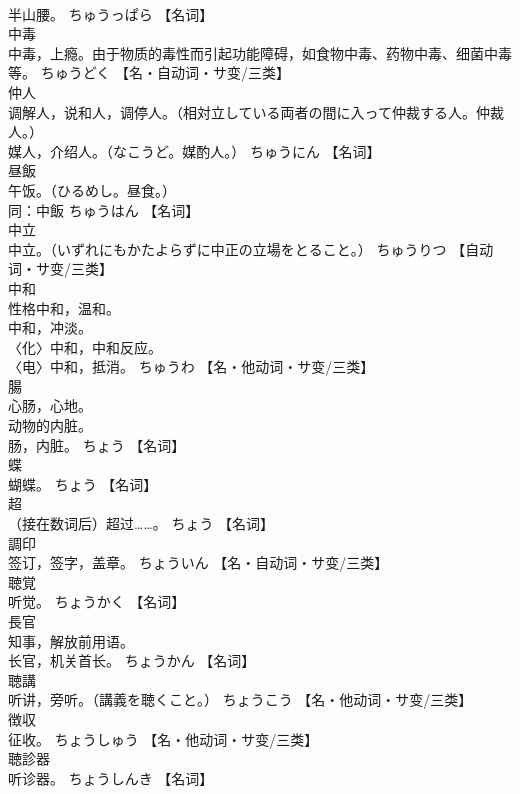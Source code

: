 \documentclass[8pt]{extreport}
\begin{document}
\begin{CJK}{UTF8}{min}
\\	半山腰。	ちゅうっぱら		【名词】
\\	中毒	
\\	中毒，上瘾。由于物质的毒性而引起功能障碍，如食物中毒、药物中毒、细菌中毒等。	ちゅうどく		【名・自动词・サ变/三类】
\\	仲人	
\\	调解人，说和人，调停人。（相対立している両者の間に入って仲裁する人。仲裁人。） 
\\	媒人，介绍人。（なこうど。媒酌人。）	ちゅうにん		【名词】
\\	昼飯	
\\	午饭。（ひるめし。昼食。） 
\\	同：中飯	ちゅうはん		【名词】
\\	中立	
\\	中立。（いずれにもかたよらずに中正の立場をとること。）	ちゅうりつ		【自动词・サ变/三类】
\\	中和	
\\	性格中和，温和。 
\\	中和，冲淡。 
\\	〈化〉中和，中和反应。 
\\	〈电〉中和，抵消。	ちゅうわ		【名・他动词・サ变/三类】
\\	腸	
\\	心肠，心地。 
\\	动物的内脏。 
\\	肠，内脏。	ちょう		【名词】
\\	蝶	
\\	蝴蝶。	ちょう		【名词】
\\	超	
\\	（接在数词后）超过……。	ちょう		【名词】
\\	調印	
\\	签订，签字，盖章。	ちょういん		【名・自动词・サ变/三类】
\\	聴覚	
\\	听觉。	ちょうかく		【名词】
\\	長官	
\\	知事，解放前用语。 
\\	长官，机关首长。	ちょうかん		【名词】
\\	聴講	
\\	听讲，旁听。（講義を聴くこと。）	ちょうこう		【名・他动词・サ变/三类】
\\	徴収	
\\	征收。	ちょうしゅう		【名・他动词・サ变/三类】
\\	聴診器	
\\	听诊器。	ちょうしんき		【名词】

\end{CJK}
\end{document}
